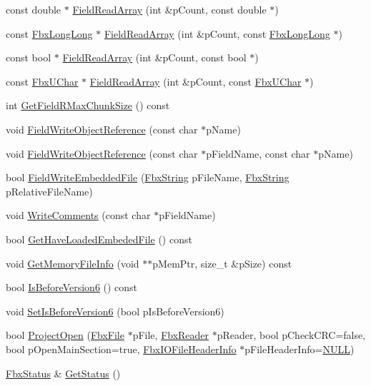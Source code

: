 \begin{DoxyCompactItemize}
const double $\ast$ \hyperlink{class_fbx_i_o_a028d17076626570f69daaea0ebb7b70f}{Field\+Read\+Array} (int \&p\+Count, const double $\ast$)
\item 
const \hyperlink{fbxtypes_8h_ac34da60c22b0a7e1156e5480da7d71f1}{Fbx\+Long\+Long} $\ast$ \hyperlink{class_fbx_i_o_a20d873aabea2cd1209b91c4ae81bfdd3}{Field\+Read\+Array} (int \&p\+Count, const \hyperlink{fbxtypes_8h_ac34da60c22b0a7e1156e5480da7d71f1}{Fbx\+Long\+Long} $\ast$)
\item 
const bool $\ast$ \hyperlink{class_fbx_i_o_a123c8555fc81a3d2b68e876d5da1e8a9}{Field\+Read\+Array} (int \&p\+Count, const bool $\ast$)
\item 
const \hyperlink{fbxtypes_8h_a1be3cadf61e76f49142eb83e66ffe8bd}{Fbx\+U\+Char} $\ast$ \hyperlink{class_fbx_i_o_a9888055efaf571a84ec3f067d55c2a21}{Field\+Read\+Array} (int \&p\+Count, const \hyperlink{fbxtypes_8h_a1be3cadf61e76f49142eb83e66ffe8bd}{Fbx\+U\+Char} $\ast$)
\item 
int \hyperlink{class_fbx_i_o_a31fd3de545578822a1f85ee1678a2511}{Get\+Field\+R\+Max\+Chunk\+Size} () const
\item 
void \hyperlink{class_fbx_i_o_aad1b5a1df012a364e30241ffb6d4dac4}{Field\+Write\+Object\+Reference} (const char $\ast$p\+Name)
\item 
void \hyperlink{class_fbx_i_o_ae1f6548be8db76abf8c97e36f32ce9ac}{Field\+Write\+Object\+Reference} (const char $\ast$p\+Field\+Name, const char $\ast$p\+Name)
\item 
bool \hyperlink{class_fbx_i_o_a8422d3d70bd65a27d566110ff164280f}{Field\+Write\+Embedded\+File} (\hyperlink{class_fbx_string}{Fbx\+String} p\+File\+Name, \hyperlink{class_fbx_string}{Fbx\+String} p\+Relative\+File\+Name)
\item 
void \hyperlink{class_fbx_i_o_ad398957872b53812a76461fba6aacc8d}{Write\+Comments} (const char $\ast$p\+Field\+Name)
\item 
bool \hyperlink{class_fbx_i_o_a4280b5f11fdc101c7bd82da1649b7752}{Get\+Have\+Loaded\+Embeded\+File} () const
\item 
void \hyperlink{class_fbx_i_o_ab1dbd1a441921b3c851a590efaafdeff}{Get\+Memory\+File\+Info} (void $\ast$$\ast$p\+Mem\+Ptr, size\+\_\+t \&p\+Size) const
\item 
bool \hyperlink{class_fbx_i_o_aeedbe8302295c34608a1b55b8c50c09e}{Is\+Before\+Version6} () const
\item 
void \hyperlink{class_fbx_i_o_a6846d5fc3fa3f6317a2765c9bf9a13b4}{Set\+Is\+Before\+Version6} (bool p\+Is\+Before\+Version6)
\item 
bool \hyperlink{class_fbx_i_o_aa1f0912ef36d3f63e7bbd0dccb514fcb}{Project\+Open} (\hyperlink{class_fbx_file}{Fbx\+File} $\ast$p\+File, \hyperlink{class_fbx_reader}{Fbx\+Reader} $\ast$p\+Reader, bool p\+Check\+C\+RC=false, bool p\+Open\+Main\+Section=true, \hyperlink{class_fbx_i_o_file_header_info}{Fbx\+I\+O\+File\+Header\+Info} $\ast$p\+File\+Header\+Info=\hyperlink{fbxarch_8h_a070d2ce7b6bb7e5c05602aa8c308d0c4}{N\+U\+LL})
\item 
\hyperlink{class_fbx_status}{Fbx\+Status} \& \hyperlink{class_fbx_i_o_a26f7bc52b2e648a47a463b95287990b6}{Get\+Status} ()
\end{DoxyCompactItemize}
